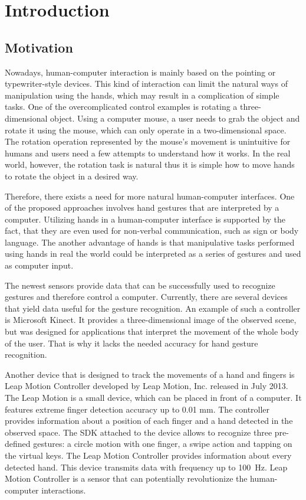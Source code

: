 \chapter{Introduction}

\section{Motivation}

Nowadays, human-computer interaction is mainly based on the pointing or typewriter-style devices. 
This kind of interaction can limit the natural ways of manipulation using the hands, which may result in a complication of simple tasks.
One of the overcomplicated control examples is rotating a three-dimensional object.
Using a computer mouse, a user needs to grab the object and rotate it using the mouse, which can only operate in a two-dimensional space. 
The rotation operation represented by the mouse's movement is unintuitive for humans and users need a few attempts to understand how it works. 
In the real world, however, the rotation task is natural thus it is simple how to move hands to rotate the object in a desired way.

Therefore, there exists a need for more natural human-computer interfaces.
One of the proposed approaches involves hand gestures that are interpreted by a computer.
Utilizing hands in a human-computer interface is supported by the fact, that they are even used for non-verbal communication, such as sign or body language.
The another advantage of hands is that manipulative tasks performed using hands in real the world could be interpreted as a series of gestures and used as computer input.

The newest sensors provide data that can be successfully used to recognize gestures and therefore control a computer.
Currently, there are several devices that yield data useful for the gesture recognition. 
An example of such a controller is Microsoft Kinect.
It provides a three-dimensional image of the observed scene, but was designed for applications that interpret the movement of the whole body of the user. 
That is why it lacks the needed accuracy for hand gesture recognition.
 
Another device that is designed to track the movements of a hand and fingers is Leap Motion Controller developed by Leap Motion, Inc. released in July 2013. 
The Leap Motion is a small device, which can be placed in front of a computer. It features extreme finger detection accuracy up to 0.01 mm. 
The controller provides information about a position of each finger and a hand detected in the observed space.
The SDK attached to the device allows to recognize three pre-defined gestures: a circle motion with one finger, a swipe action and tapping on the virtual keys. 
The Leap Motion Controller provides information about every detected hand. This device transmits data with frequency up to 100~Hz. 
Leap Motion Controller is a sensor that can potentially revolutionize the human-computer interactions. 

